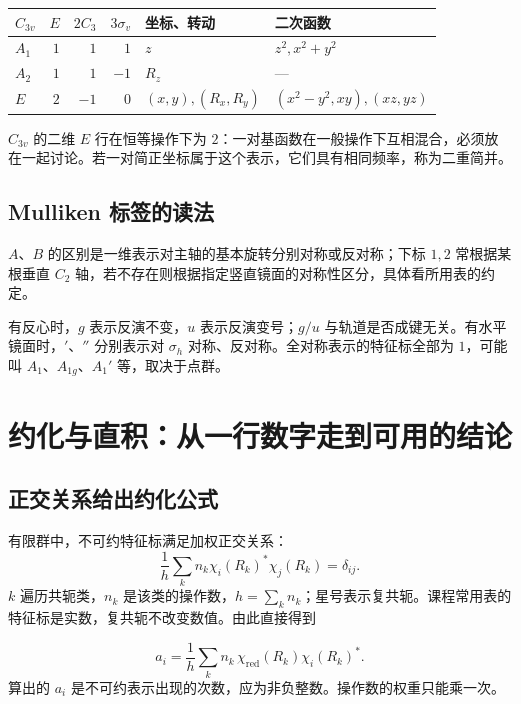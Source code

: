 \begin{center}
\small
\begin{tabularx}{\linewidth}{@{}l rrr X X@{}}
\toprule
$C_{3v}$ & $E$ & $2C_3$ & $3\sigma_v$ & 坐标、转动 & 二次函数 \\
\midrule
$A_1$ & $1$ & $1$ & $1$ & $z$ & $z^2,x^2+y^2$ \\
$A_2$ & $1$ & $1$ & $-1$ & $R_z$ & --- \\
$E$ & $2$ & $-1$ & $0$ & $(x,y),(R_x,R_y)$ & $(x^2-y^2,xy),(xz,yz)$ \\
\bottomrule
\end{tabularx}
\end{center}

$C_{3v}$ 的二维 $E$ 行在恒等操作下为 $2$：一对基函数在一般操作下互相混合，必须放在一起讨论。若一对简正坐标属于这个表示，它们具有相同频率，称为二重简并。

\subsection{Mulliken 标签的读法}
$A$、$B$ 的区别是一维表示对主轴的基本旋转分别对称或反对称；下标 $1,2$ 常根据某根垂直 $C_2$ 轴，若不存在则根据指定竖直镜面的对称性区分，具体看所用表的约定。

有反心时，$g$ 表示反演不变，$u$ 表示反演变号；$g/u$ 与轨道是否成键无关。有水平镜面时，$'$、$''$ 分别表示对 $\sigma_h$ 对称、反对称。全对称表示的特征标全部为 $1$，可能叫 $A_1$、$A_{1g}$、$A_1'$ 等，取决于点群。

\section{约化与直积：从一行数字走到可用的结论}
\label{sec:reduction}

\subsection{正交关系给出约化公式}
有限群中，不可约特征标满足加权正交关系：
\[
 \frac{1}{h}\sum_k n_k\chi_i(R_k)^*\chi_j(R_k)=\delta_{ij}.
\]
$k$ 遍历共轭类，$n_k$ 是该类的操作数，$h=\sum_kn_k$；星号表示复共轭。课程常用表的特征标是实数，复共轭不改变数值。由此直接得到
\begin{keyidea}
\[
 \boxed{a_i=\frac{1}{h}\sum_k n_k\,
 \chi_{\mathrm{red}}(R_k)\chi_i(R_k)^*}.
\]
算出的 $a_i$ 是不可约表示出现的次数，应为非负整数。操作数的权重只能乘一次。
\end{keyidea}

